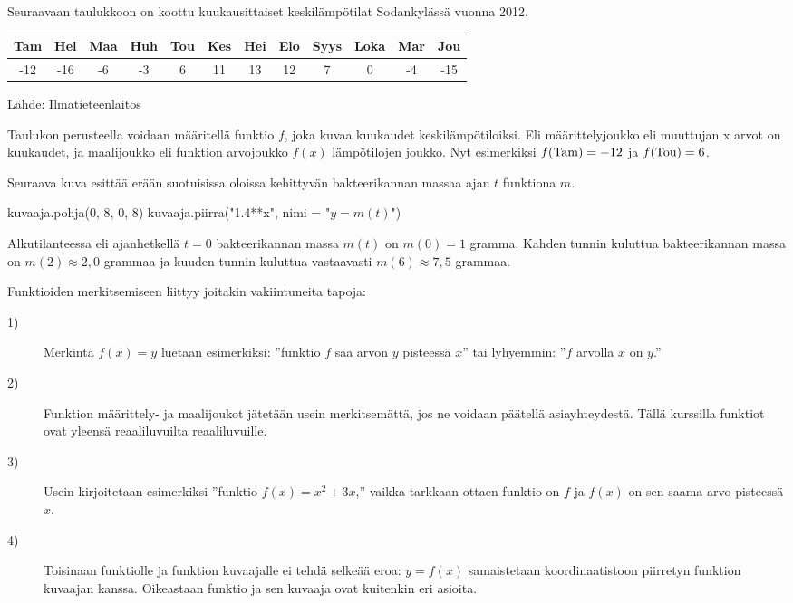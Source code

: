 \begin{esimerkki}
Seuraavaan taulukkoon on koottu kuukausittaiset keskilämpötilat Sodankylässä vuonna 2012.

	\begin{tabular}{|c|c|c|c|c|c|c|c|c|c|c|c|}
	\hline
	Tam & Hel & Maa & Huh & Tou & Kes & Hei & Elo & Syys & Loka & Mar & Jou\\
	\hline
	-12 & -16 & -6 & -3 & 6 & 11 & 13 & 12 & 7 & 0 & -4 & -15\\
	\hline
	\end{tabular}
Lähde: Ilmatieteenlaitos

Taulukon perusteella voidaan määritellä funktio $f$, joka kuvaa kuukaudet keskilämpötiloiksi. Eli määrittelyjoukko eli muuttujan x arvot on kuukaudet, ja maalijoukko eli funktion arvojoukko \(f(x)\) lämpötilojen joukko. Nyt esimerkiksi \(f($Tam$)=-12\) ja \(f($Tou$) = 6\). 
\end{esimerkki}

\begin{esimerkki}
Seuraava kuva esittää erään suotuisissa oloissa kehittyvän bakteerikannan massaa ajan \(t\) funktiona $m$.

\begin{kuva}
    kuvaaja.pohja(0, 8, 0, 8)
    kuvaaja.piirra("1.4**x", nimi = "$y=m(t)$")
\end{kuva}

Alkutilanteessa eli ajanhetkellä \(t=0\) bakteerikannan massa \(m(t)\) on \(m(0)=1\) gramma. Kahden tunnin kuluttua bakteerikannan massa on \(m(2)\approx 2,0\) grammaa ja kuuden tunnin kuluttua vastaavasti \(m(6)\approx 7,5\) grammaa. 
\end{esimerkki}

Funktioiden merkitsemiseen liittyy joitakin vakiintuneita tapoja:
\begin{description}
	\item[1)] Merkintä $f(x) = y$ luetaan esimerkiksi: ''funktio \(f\) saa arvon $y$ pisteessä $x$'' tai lyhyemmin: ''\(f\) arvolla \(x\) on \(y\).''
	\item[2)] Funktion määrittely- ja maalijoukot jätetään usein merkitsemättä, jos ne voidaan päätellä asiayhteydestä.
		Tällä kurssilla funktiot ovat yleensä reaaliluvuilta reaaliluvuille.
	\item[3)] Usein kirjoitetaan esimerkiksi ''funktio $f(x) = x^2+3x$,'' vaikka tarkkaan ottaen funktio on $f$ ja
		$f(x)$ on sen saama arvo pisteessä $x$.
	\item[4)] Toisinaan funktiolle ja funktion kuvaajalle ei tehdä selkeää eroa:
		$y = f(x)$ samaistetaan koordinaatistoon piirretyn funktion kuvaajan kanssa.
		Oikeastaan funktio ja sen kuvaaja ovat kuitenkin eri asioita.
\end{description}

